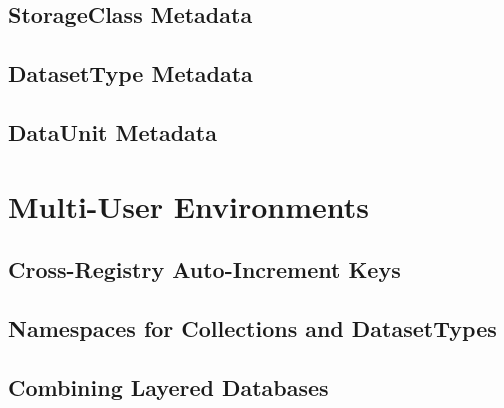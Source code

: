 \documentclass[DM,toc]{lsstdoc}
\begin{document}
\subsection{StorageClass Metadata}
\label{sec:storageclass-metadata}

\subsection{DatasetType Metadata}
\label{sec:datasettype-metadata}

\subsection{DataUnit Metadata}
\label{sec:dataunit-metadata}


\section{Multi-User Environments}
\label{sec:multi-user-environments}

\subsection{Cross-Registry Auto-Increment Keys}
\label{sec:cross-registry-auto-increment-keys}

\subsection{Namespaces for Collections and DatasetTypes}
\label{sec:namespaces-for-collections-and-datasettypes}

\subsection{Combining Layered Databases}
\label{sec:layered-databases}
\end{document}
